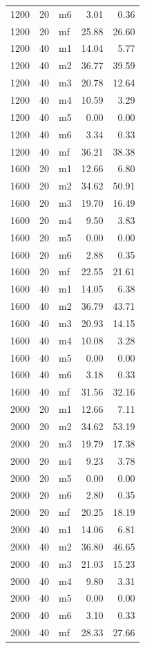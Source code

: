 \documentclass[10pt,a4paper]{article}
\begin{document}
\begin{center}
\begin{longtable}{rrlrr}
1200 & 20 & m6 & 3.01 & 0.36 \\
1200 & 20 & mf & 25.88 & 26.60 \\
1200 & 40 & m1 & 14.04 & 5.77 \\
1200 & 40 & m2 & 36.77 & 39.59 \\
1200 & 40 & m3 & 20.78 & 12.64 \\
1200 & 40 & m4 & 10.59 & 3.29 \\
1200 & 40 & m5 & 0.00 & 0.00 \\
1200 & 40 & m6 & 3.34 & 0.33 \\
1200 & 40 & mf & 36.21 & 38.38 \\
1600 & 20 & m1 & 12.66 & 6.80 \\
1600 & 20 & m2 & 34.62 & 50.91 \\
1600 & 20 & m3 & 19.70 & 16.49 \\
1600 & 20 & m4 & 9.50 & 3.83 \\
1600 & 20 & m5 & 0.00 & 0.00 \\
1600 & 20 & m6 & 2.88 & 0.35 \\
1600 & 20 & mf & 22.55 & 21.61 \\
1600 & 40 & m1 & 14.05 & 6.38 \\
1600 & 40 & m2 & 36.79 & 43.71 \\
1600 & 40 & m3 & 20.93 & 14.15 \\
1600 & 40 & m4 & 10.08 & 3.28 \\
1600 & 40 & m5 & 0.00 & 0.00 \\
1600 & 40 & m6 & 3.18 & 0.33 \\
1600 & 40 & mf & 31.56 & 32.16 \\
2000 & 20 & m1 & 12.66 & 7.11 \\
2000 & 20 & m2 & 34.62 & 53.19 \\
2000 & 20 & m3 & 19.79 & 17.38 \\
2000 & 20 & m4 & 9.23 & 3.78 \\
2000 & 20 & m5 & 0.00 & 0.00 \\
2000 & 20 & m6 & 2.80 & 0.35 \\
2000 & 20 & mf & 20.25 & 18.19 \\
2000 & 40 & m1 & 14.06 & 6.81 \\
2000 & 40 & m2 & 36.80 & 46.65 \\
2000 & 40 & m3 & 21.03 & 15.23 \\
2000 & 40 & m4 & 9.80 & 3.31 \\
2000 & 40 & m5 & 0.00 & 0.00 \\
2000 & 40 & m6 & 3.10 & 0.33 \\
2000 & 40 & mf & 28.33 & 27.66 \\
\bottomrule\end{longtable}\end{center}
\end{document}
